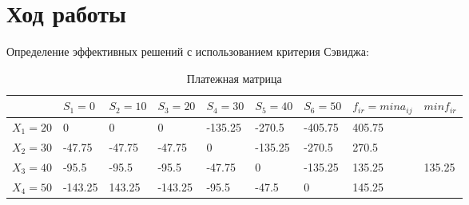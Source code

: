 \documentclass[a4paper,14pt]{extarticle}
\begin{document}
\section{Ход работы}
Определение эффективных решений с использованием критерия Сэвиджа:
\begin{table}[H]
    \caption{Платежная матрица}
    \begin{tabular}{ | p{1.4cm} | p{1.4cm} | p{1.4cm} | p{1.4cm} | p{1.4cm} | p{1.4cm} | p{1.4cm} | p{1.4cm} | p{1.4cm} |}
        \hline
         & $S_1=0$ & $S_2=10$ & $S_3=20$ & $S_4=30$ & $S_5=40$ & $S_6=50$ & $f_{ir} = min a_{ij}$ & $min f_{ir} $ \\ \hline
        $X_1=20$ & 0 & 0 & 0 & -135.25 & -270.5 & -405.75 & 405.75 & \\ \hline
        $X_2=30$ & -47.75 & -47.75 & -47.75 & 0 & -135.25 & -270.5 & 270.5 & \\ \hline
        $X_3=40$ & -95.5 & -95.5 & -95.5 & -47.75 & 0 & -135.25 & 135.25 & 135.25 \\ \hline
        $X_4=50$ & -143.25 & 143.25 & -143.25 & -95.5 & -47.5 & 0 & 145.25 & \\ \hline
    \end{tabular}
\end{table}
\end{document}
